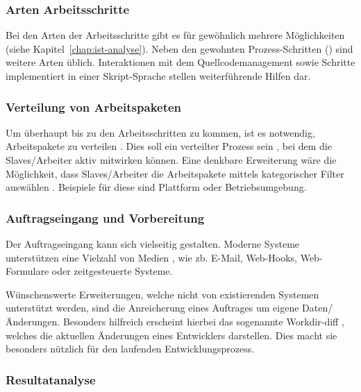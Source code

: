 \subsubsection{Arten Arbeitsschritte}

Bei den Arten der Arbeitsschritte gibt es für gew\"ohnlich mehrere M\"oglichkeiten (siehe Kapitel~\ref{chap:ist-analyse}).
Neben den gewohnten Prozess-Schritten () sind weitere Arten \"ublich.
Interaktionen mit dem Quellcodemanagement  sowie
Schritte implementiert in einer Skript-Sprache 
stellen weiterf\"uhrende Hilfen dar.

\subsubsection{Verteilung von Arbeitspaketen}

Um \"uberhaupt bis zu den Arbeitsschritten zu kommen,
ist es notwendig, Arbeitspakete zu verteilen .
Dies soll ein verteilter Prozess sein ,
bei dem die Slaves/Arbeiter aktiv mitwirken k\"onnen.
Eine denkbare Erweiterung w\"are die Möglichkeit, dass Slaves/Arbeiter
die Arbeitspakete mittels kategorischer Filter auswählen .
Beispiele f\"ur diese sind Plattform oder Betriebsumgebung.

\subsubsection{Auftragseingang und Vorbereitung}


Der Auftragseingang kann sich vielseitig gestalten.
Moderne Systeme unterstützen eine Vielzahl von Medien ,
wie zb. E-Mail, Web-Hooks, Web-Formulare oder zeitgesteuerte Systeme.

W\"unschenswerte Erweiterungen, welche nicht von existierenden Systemen unterst\"utzt werden,
sind die Anreicherung eines Auftrages um eigene Daten/\"Anderungen.
Besonders hilfreich erscheint hierbei das sogenannte Workdir-diff ,
welches die aktuellen \"Anderungen eines Entwicklers darstellen.
Dies macht sie besonders n\"utzlich f\"ur den laufenden Entwicklungsprozess.

\subsubsection{Resultatanalyse}

